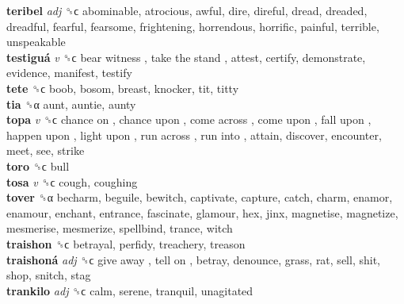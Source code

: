 \textbf{teribel} \emph{adj}  ␝ϲ  abominable, atrocious, awful, dire, direful, dread, dreaded, dreadful, fearful, fearsome, frightening, horrendous, horrific, painful, terrible, unspeakable  \\
\textbf{testiguá} \emph{v}  ␝ϲ   bear witness ,  take the stand , attest, certify, demonstrate, evidence, manifest, testify  \\
\textbf{tete} ␝ϲ  boob, bosom, breast, knocker, tit, titty  \\
\textbf{tia} ␝α  aunt, auntie, aunty  \\
\textbf{topa} \emph{v}  ␝ϲ   chance on ,  chance upon ,  come across ,  come upon ,  fall upon ,  happen upon ,  light upon ,  run across ,  run into , attain, discover, encounter, meet, see, strike  \\
\textbf{toro} ␝ϲ  bull  \\
\textbf{tosa} \emph{v}  ␝ϲ  cough, coughing  \\
\textbf{tover} ␝α  becharm, beguile, bewitch, captivate, capture, catch, charm, enamor, enamour, enchant, entrance, fascinate, glamour, hex, jinx, magnetise, magnetize, mesmerise, mesmerize, spellbind, trance, witch  \\
\textbf{traishon} ␝ϲ  betrayal, perfidy, treachery, treason  \\
\textbf{traishoná} \emph{adj}  ␝ϲ   give away ,  tell on , betray, denounce, grass, rat, sell, shit, shop, snitch, stag  \\
\textbf{trankilo} \emph{adj}  ␝ϲ  calm, serene, tranquil, unagitated  \\
